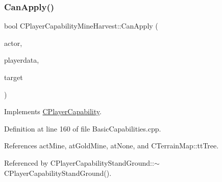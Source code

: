 \subsubsection{\texorpdfstring{Can\+Apply()}{CanApply()}}
{\footnotesize\ttfamily bool C\+Player\+Capability\+Mine\+Harvest\+::\+Can\+Apply (\begin{DoxyParamCaption}\item[{std\+::shared\+\_\+ptr$<$ \hyperlink{classCPlayerAsset}{C\+Player\+Asset} $>$}]{actor,  }\item[{std\+::shared\+\_\+ptr$<$ \hyperlink{classCPlayerData}{C\+Player\+Data} $>$}]{playerdata,  }\item[{std\+::shared\+\_\+ptr$<$ \hyperlink{classCPlayerAsset}{C\+Player\+Asset} $>$}]{target }\end{DoxyParamCaption})\hspace{0.3cm}{\ttfamily [virtual]}}



Implements \hyperlink{classCPlayerCapability_ae96263e0950f496492f8baeb877b9554}{C\+Player\+Capability}.



Definition at line 160 of file Basic\+Capabilities.\+cpp.



References act\+Mine, at\+Gold\+Mine, at\+None, and C\+Terrain\+Map\+::tt\+Tree.



Referenced by C\+Player\+Capability\+Stand\+Ground\+::$\sim$\+C\+Player\+Capability\+Stand\+Ground().



